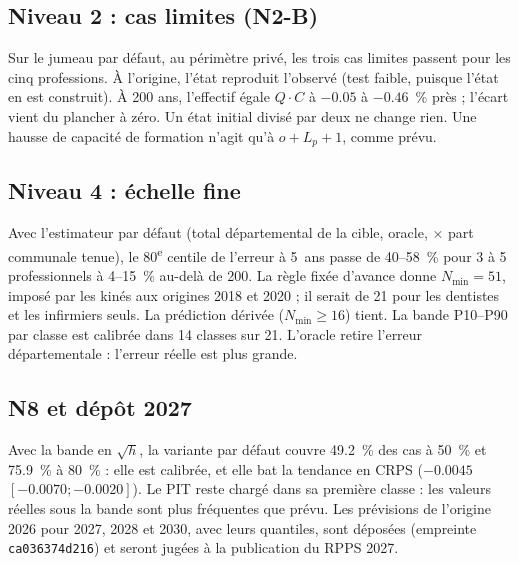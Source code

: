 \documentclass[11pt]{article}
\begin{document}
\subsection{Niveau 2 : cas limites (N2-B)}
Sur le jumeau par défaut, au périmètre privé, les trois cas limites passent pour les cinq
professions. À l'origine, l'état reproduit l'observé (test faible, puisque l'état en est construit).
À 200 ans, l'effectif égale $Q \cdot C$ à $-\num{0.05}$ à $-\num{0.46}$\mesure{}~\% près ; l'écart vient
du plancher à zéro. Un état initial divisé par deux ne change rien. Une hausse de capacité de
formation n'agit qu'à $o + L_p + 1$\mesure{}, comme prévu.

\subsection{Niveau 4 : échelle fine}
Avec l'estimateur par défaut (total départemental de la cible, oracle, $\times$ part communale tenue),
le 80\textsuperscript{e} centile de l'erreur à 5~ans passe de 40--58\mesure{}~\% pour 3 à 5
professionnels à 4--15\mesure{}~\% au-delà de 200. La règle fixée d'avance donne
$N_{\min} = 51$\mesure{}, imposé par les kinés aux origines 2018 et 2020 ; il serait de 21 pour les
dentistes et les infirmiers seuls. La prédiction dérivée ($N_{\min} \ge 16$) tient. La bande
P10--P90 par classe est calibrée dans 14 classes sur 21\mesure{}. L'oracle retire l'erreur
départementale : l'erreur réelle est plus grande.

\subsection{N8 et dépôt 2027}
Avec la bande en $\sqrt h$, la variante par défaut couvre \num{49.2}\mesure{}~\% des cas à 50~\% et
\num{75.9}\mesure{}~\% à 80~\% : elle est calibrée, et elle bat la tendance en CRPS
($\num{-0.0045}$ $[\num{-0.0070} ; \num{-0.0020}]$\mesure{}). Le PIT reste chargé dans sa première
classe : les valeurs réelles sous la bande sont plus fréquentes que prévu. Les prévisions de
l'origine 2026 pour 2027, 2028 et 2030, avec leurs quantiles, sont déposées (empreinte
\texttt{ca036374d216}) et seront jugées à la publication du RPPS 2027.
\end{document}
